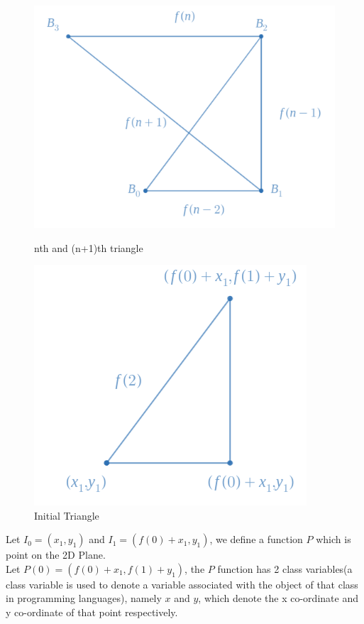 \documentclass{article}
\begin{document}
\begin{figure}
    \centering
    \begin{minipage}{0.45\textwidth}
    	\label{fig1}
        \centering
        \includegraphics[scale=0.4]{images/GFKT1.png}
        \caption{nth and (n+1)th triangle}
    \end{minipage}\hfill
    \begin{minipage}{0.45\textwidth}
        \centering
        \includegraphics[scale=0.46]{images/GFKT2.png}
        \caption{Initial Triangle}
    \end{minipage}
\end{figure}
Let $I_0 = (x_1, y_1)$ and $I_1 = (f(0) + x_1, y_1)$, we define a function $P$ which is point on the 2D Plane.\\
Let $P(0) = (f(0) + x_1, f(1) + y_1)$, the $P$ function has 2 class variables(a class variable is used to denote a variable associated with the object of that class in programming languages), namely $x$ and $y$, which denote the x co-ordinate and y co-ordinate of that point respectively.\\
\end{document}
